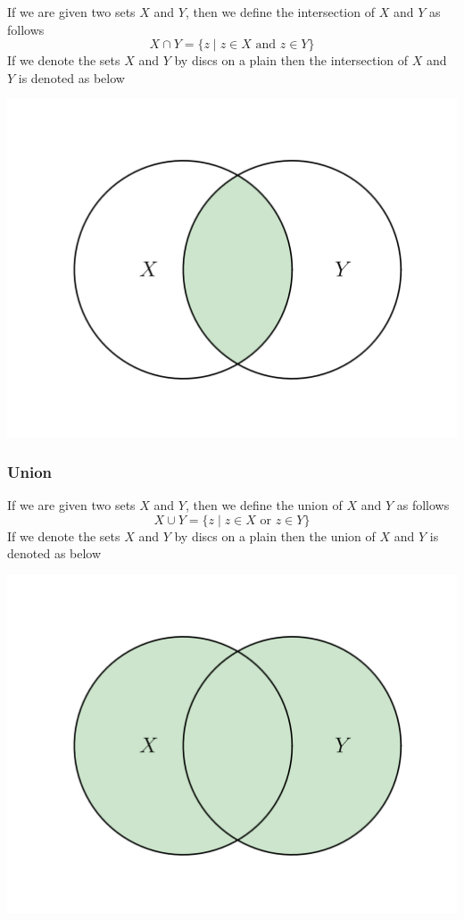 If we are given two sets $X$ and $Y$, then we define the intersection of $X$ and $Y$ as follows
\[
X \cap Y = \{z\mid z\in X\text{ and } z\in Y\}
\]
If we denote the sets $X$ and $Y$ by discs on a plain then the intersection of $X$ and $Y$ is denoted as below
\begin{center}
\includegraphics[scale = 0.3]{Figures/graph_intersection.png}
\end{center}

\subsubsection{Union}

If we are given two sets $X$ and $Y$, then we define the union of $X$ and $Y$ as follows
\[
X \cup Y = \{z\mid z\in X\text{ or }z\in Y\}
\]
If we denote the sets $X$ and $Y$ by discs on a plain then the union of $X$ and $Y$ is denoted as below
\begin{center}
\includegraphics[scale = 0.3]{Figures/graph_union.png}
\end{center}

